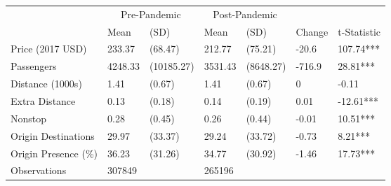 
\begin{tabular}[t]{lllllll}
\toprule
\multicolumn{1}{c}{ } & \multicolumn{2}{c}{Pre-Pandemic} & \multicolumn{2}{c}{Post-Pandemic} & \multicolumn{2}{c}{ } \\
\cmidrule(l{3pt}r{3pt}){2-3} \cmidrule(l{3pt}r{3pt}){4-5}
 & Mean & (SD) & Mean & (SD) & Change & t-Statistic\\
\midrule
Price (2017 USD) & 233.37 & (68.47) & 212.77 & (75.21) & -20.6 & 107.74***\\
Passengers & 4248.33 & (10185.27) & 3531.43 & (8648.27) & -716.9 & 28.81***\\
Distance (1000s) & 1.41 & (0.67) & 1.41 & (0.67) & 0 & -0.11\\
Extra Distance & 0.13 & (0.18) & 0.14 & (0.19) & 0.01 & -12.61***\\
Nonstop & 0.28 & (0.45) & 0.26 & (0.44) & -0.01 & 10.51***\\
Origin Destinations & 29.97 & (33.37) & 29.24 & (33.72) & -0.73 & 8.21***\\
Origin Presence (\%) & 36.23 & (31.26) & 34.77 & (30.92) & -1.46 & 17.73***\\
Observations & 307849 &  & 265196 &  &  & \\
\bottomrule
\end{tabular}
